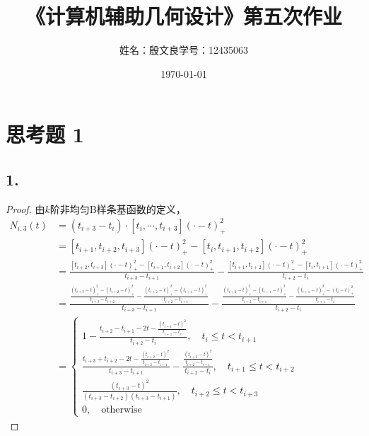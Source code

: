 \documentclass[utf8]{ctexart}
\title{《计算机辅助几何设计》第五次作业}
\author{姓名：殷文良\qquad 学号：12435063}
\date{\today}
\begin{document}
\maketitle
{}

\section*{思考题 1}
\subsection*{1.}
\begin{proof}
    由$k$阶非均匀B样条基函数的定义，
    \begin{equation*}
        \begin{aligned}
            N_{i,3}(t) &= (t_{i+3}-t_i)\cdot [t_i,\cdots,t_{i+3}](\cdot-t)_+^2\\
            &= [t_{i+1},t_{i+2},t_{i+3}](\cdot-t)_+^2 - [t_{i},t_{i+1},t_{i+2}](\cdot-t)_+^2\\
            &= \frac{[t_{i+2},t_{i+3}](\cdot-t)_+^2 - [t_{i+1},t_{i+2}](\cdot-t)_+^2}{t_{i+3} - t_{i+1}} - \frac{[t_{i+1},t_{i+2}](\cdot-t)_+^2 - [t_{i},t_{i+1}](\cdot-t)_+^2}{t_{i+2} - t_{i}}\\
            &= \frac{\frac{(t_{i+3}-t)_+^2 - (t_{i+2}-t)_+^2}{t_{i+3}-t_{i+2}} - \frac{(t_{i+2}-t)_+^2 - (t_{i+1}-t)_+^2}{t_{i+2}-t_{i+1}}}{t_{i+3} - t_{i+1}}
            - \frac{\frac{(t_{i+2}-t)_+^2 - (t_{i+1}-t)_+^2}{t_{i+2}-t_{i+1}} - \frac{(t_{i+1}-t)_+^2 - (t_{i}-t)_+^2}{t_{i+1}-t_{i}}}{t_{i+2} - t_{i}}\\
            &= 
            \begin{cases}
                1 - \frac{t_{i+2}-t_{i+1}-2t-\frac{(t_{i+1}-t)^2}{t_{i+1}-t_i}}{t_{i+2}-t_i},\quad t_i \leq t < t_{i+1}\\
                \frac{t_{i+3}+t_{i+2}-2t - \frac{(t_{i+2}-t)^2}{t_{i+2}-t_{i+1}}}{t_{i+3}-t_{i+1}} - \frac{\frac{(t_{i+2}-t)^2}{t_{i+2}-t_{i+1}}}{t_{i+2}-t_i},\quad t_{i+1} \leq t < t_{i+2}\\
                \frac{(t_{i+3}-t)^2}{(t_{i+3}-t_{i+2})(t_{i+3}-t_{i+1})},\quad t_{i+2} \leq t < t_{i+3}\\
                0,\quad \text{otherwise}
            \end{cases}
        \end{aligned}
    \end{equation*}
\end{proof}
\end{document}
